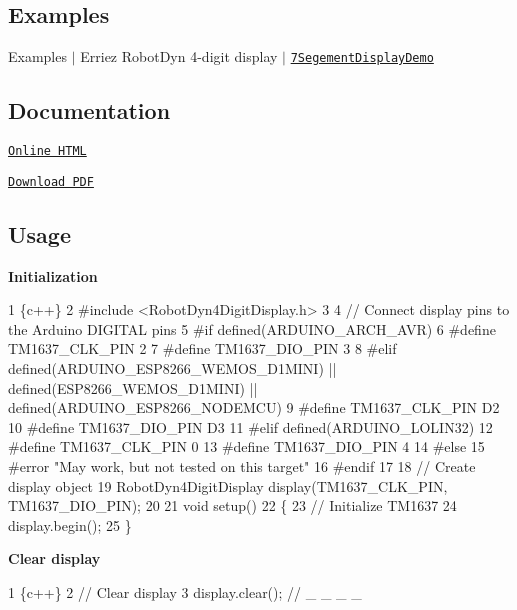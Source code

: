 \subsection*{Examples}

Examples $\vert$ Erriez Robot\+Dyn 4-\/digit display $\vert$ \href{https://github.com/Erriez/ErriezRobotDyn4DigitDisplay/blob/master/examples/7SegementDisplayDemo/7SegementDisplayDemo.ino}{\tt 7\+Segement\+Display\+Demo}

\subsection*{Documentation}


\begin{DoxyItemize}
\item \href{https://erriez.github.io/ErriezRobotDyn4DigitDisplay}{\tt Online H\+T\+ML}
\item \href{https://github.com/Erriez/ErriezRobotDyn4DigitDisplay/raw/gh-pages/latex/ErriezRobotDyn4DigitDisplay.pdf}{\tt Download P\+DF}
\end{DoxyItemize}

\subsection*{Usage}

{\bfseries Initialization}


\begin{DoxyCode}
1 \{c++\}
2 #include <RobotDyn4DigitDisplay.h>
3 
4 // Connect display pins to the Arduino DIGITAL pins
5 #if defined(ARDUINO\_ARCH\_AVR)
6 #define TM1637\_CLK\_PIN      2
7 #define TM1637\_DIO\_PIN      3
8 #elif defined(ARDUINO\_ESP8266\_WEMOS\_D1MINI) || defined(ESP8266\_WEMOS\_D1MINI) ||
       defined(ARDUINO\_ESP8266\_NODEMCU)
9 #define TM1637\_CLK\_PIN      D2
10 #define TM1637\_DIO\_PIN      D3
11 #elif defined(ARDUINO\_LOLIN32)
12 #define TM1637\_CLK\_PIN      0
13 #define TM1637\_DIO\_PIN      4
14 #else
15 #error "May work, but not tested on this target"
16 #endif
17 
18 // Create display object
19 RobotDyn4DigitDisplay display(TM1637\_CLK\_PIN, TM1637\_DIO\_PIN);
20 
21 void setup()
22 \{
23     // Initialize TM1637
24     display.begin();
25 \}
\end{DoxyCode}


{\bfseries Clear display}


\begin{DoxyCode}
1 \{c++\}
2 // Clear display
3 display.clear();    // \_ \_ \_ \_
\end{DoxyCode}



